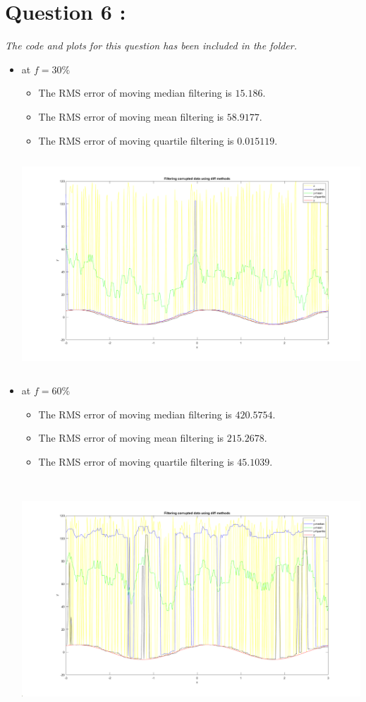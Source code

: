 \documentclass[11pt,a4paper,titlepage]{article}
\begin{document}
{{}
\newpage






\section{Question 6 : }{
\textit{The code and plots for this question has been included in the folder.} \\
\begin{itemize}
    \item at $f = 30\%$
    \begin{itemize}
        \item The RMS error of moving median filtering is $15.186$.
        \item The RMS error of moving mean filtering is $58.9177$.
        \item The RMS error of moving quartile filtering is $0.015119$.
    \end{itemize}
    \includegraphics[width=15cm, height=8cm]{images/q6_1.png}
    \item at $f = 60\%$
    \begin{itemize}
        \item The RMS error of moving median filtering is $420.5754$.
        \item The RMS error of moving mean filtering is $215.2678$.
        \item The RMS error of moving quartile filtering is $45.1039$.
    \end{itemize}
    \includegraphics[width=15cm, height=9cm]{images/q6_2.png}

\end{itemize}}}
\end{document}

